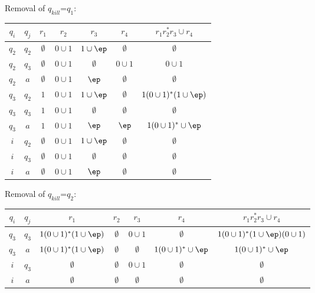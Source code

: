 Removal of $q_{kill}$=$q_{1}$:
\begin{longtable}{|c|c|c|c|c|c|c|}
\hline
$q_i$ & $q_j$ & $r_1$ & $r_2$ & $r_3$ & $r_4$ & $r_1r_2^*r_3 \cup r_4$ \\
\hline

$q_2$ & $q_2$ & $\emptyset $ & $0\cup 1$ & $1\cup \ep $ & $\emptyset $ & $\emptyset $ \\
$q_2$ & $q_3$ & $\emptyset $ & $0\cup 1$ & $\emptyset $ & $0\cup 1$ & $0\cup 1$ \\
$q_2$ & $a$ & $\emptyset $ & $0\cup 1$ & $\ep $ & $\emptyset $ & $\emptyset $ \\
$q_3$ & $q_2$ & $1$ & $0\cup 1$ & $1\cup \ep $ & $\emptyset $ & $1(0\cup 1)^*(1\cup \ep )$ \\
$q_3$ & $q_3$ & $1$ & $0\cup 1$ & $\emptyset $ & $\emptyset $ & $\emptyset $ \\
$q_3$ & $a$ & $1$ & $0\cup 1$ & $\ep $ & $\ep $ & $1(0\cup 1)^*\cup \ep $ \\
$i$ & $q_2$ & $\emptyset $ & $0\cup 1$ & $1\cup \ep $ & $\emptyset $ & $\emptyset $ \\
$i$ & $q_3$ & $\emptyset $ & $0\cup 1$ & $\emptyset $ & $\emptyset $ & $\emptyset $ \\
$i$ & $a$ & $\emptyset $ & $0\cup 1$ & $\ep $ & $\emptyset $ & $\emptyset $ \\
\hline
\end{longtable}

\begin{center}
\end{center}
    
Removal of $q_{kill}$=$q_{2}$:
\begin{longtable}{|c|c|c|c|c|c|c|}
\hline
$q_i$ & $q_j$ & $r_1$ & $r_2$ & $r_3$ & $r_4$ & $r_1r_2^*r_3 \cup r_4$ \\
\hline

$q_3$ & $q_3$ & $1(0\cup 1)^*(1\cup \ep )$ & $\emptyset $ & $0\cup 1$ & $\emptyset $ & $1(0\cup 1)^*(1\cup \ep )(0\cup 1)$ \\
$q_3$ & $a$ & $1(0\cup 1)^*(1\cup \ep )$ & $\emptyset $ & $\emptyset $ & $1(0\cup 1)^*\cup \ep $ & $1(0\cup 1)^*\cup \ep $ \\
$i$ & $q_3$ & $\emptyset $ & $\emptyset $ & $0\cup 1$ & $\emptyset $ & $\emptyset $ \\
$i$ & $a$ & $\emptyset $ & $\emptyset $ & $\emptyset $ & $\emptyset $ & $\emptyset $ \\
\hline
\end{longtable}


